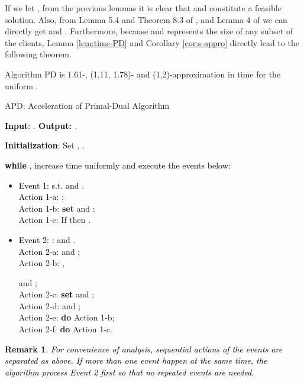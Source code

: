 \documentclass[10pt]{llncs}
\newtheorem{rem}{Remark}
\begin{document}
If we let ,
from the previous lemmas it is clear that 
and  constitute a feasible solution. Also, from Lemma 5.4
and Theorem 8.3 of \cite{Jain03dualfitting}, and Lemma 4 of \cite{Mohammad06FLP}
we can directly get 
and . Furthermore,
because  and  represents
the size of any subset of the clients, Lemma \ref{lem:time-PD} and
Corollary \ref{cor:s-appro} directly lead to the following theorem.
\begin{theorem}
Algorithm PD is 1.61-, (1.11, 1.78)- and (1,2)-approximation in time
 for the uniform
. \label{thm: multifactor}
\end{theorem}
\begin{algorithm}[H]
\caption{APD: Acceleration of Primal-Dual Algorithm}


\textbf{\textcolor{black}{Input}}\textcolor{black}{: }.\textbf{\textcolor{black}{{}
Output: }}.

\textbf{\textcolor{black}{Initialization}}\textcolor{black}{: S}et
, .

\medskip{}


\textbf{\textcolor{black}{while}}\textcolor{black}{{} ,
increase time  uniformly and execute the events below:} 
\begin{itemize}
\item \textcolor{black}{Event 1: 
s.t.  and }.\\
\textcolor{black}{Action 1-a: };\\
Action 1-b: \textbf{set}  and ;\\
Action 1-c: If  then\textbf{ }.\textcolor{black}{{}
}\medskip{}

\item \textcolor{black}{Event 2:} \textcolor{black}{:
}
and .\\
\textcolor{black}{Action 2-a: }
and ;
\\
Action 2-b: ,

and ; \\
Action 2-c: \textbf{\textcolor{black}{set}}\textcolor{black}{{} }
and ; \\
Action 2-d:  
and ; \\
Action 2-e:  \textbf{do}
Action 1-b; \\
Action 2-f:  \textbf{do}
Action 1-c.
\end{itemize}
\begin{rem} \textcolor{black}{For convenience of analysis, sequential
actions of the events are separated as above. If more than one event
happen at the same time, the algorithm process Event 2 first so that
no repeated events are needed.}\end{rem}
\end{algorithm}
\end{document}
